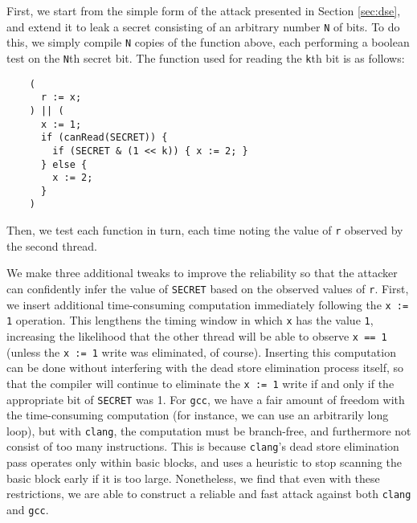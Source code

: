 
First, we start from the simple form of the attack presented in Section
\ref{sec:dse}, and extend it to leak a secret consisting of an arbitrary
number \verb|N| of bits.
To do this, we simply compile \verb|N| copies of the function above, each
performing a boolean test on the \verb|N|th secret bit.
The function used for reading the \verb|k|th bit is as follows:
\begin{verbatim}
    (
      r := x;
    ) || (
      x := 1;
      if (canRead(SECRET)) {
        if (SECRET & (1 << k)) { x := 2; }
      } else {
        x := 2;
      }
    )
\end{verbatim}
Then, we test each function in turn, each time noting the value of \verb|r|
observed by the second thread.

We make three additional tweaks to improve the reliability so that the attacker
can confidently infer the value of \verb|SECRET| based on the observed values
of \verb|r|.
First, we insert additional time-consuming computation immediately following
the \verb|x := 1| operation.
This lengthens the timing window in which \verb|x| has the value \verb|1|,
increasing the likelihood that the other thread will be able to observe
\verb|x == 1| (unless the \verb|x := 1| write was eliminated, of course).
Inserting this computation can be done without interfering with the dead store
elimination process itself, so that the compiler will continue to eliminate
the \verb|x := 1| write if and only if the appropriate bit of \verb|SECRET|
was 1.
For \verb|gcc|, we have a fair amount of freedom with the time-consuming
computation (for instance, we can use an arbitrarily long loop), but with
\verb|clang|, the computation must be branch-free, and furthermore not consist
of too many instructions.
This is because \verb|clang|'s dead store elimination pass operates only
within basic blocks, and uses a heuristic to stop scanning the basic block
early if it is too large.
Nonetheless, we find that even with these restrictions, we are able to
construct a reliable and fast attack against both \verb|clang| and \verb|gcc|.

